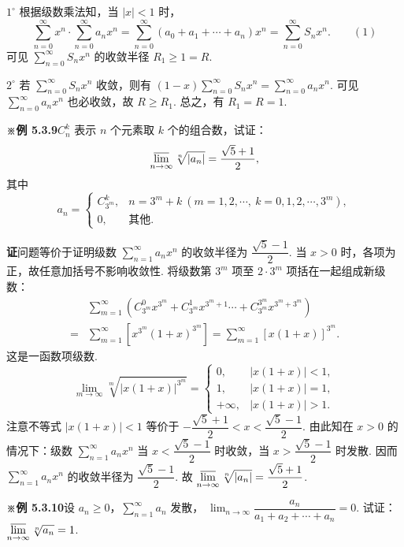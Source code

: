 \documentclass[UTF8,12pt,a4paper,fontset=fandol]{ctexart}
\begin{document}
$1^\circ$ 根据级数乘法知，当 $|x|<1$ 时，
\[
  \sum_{n=0}^{\infty}x^n\cdot\sum_{n=0}^{\infty}a_nx^n
  =\sum_{n=0}^{\infty}(a_0+a_1+\cdots+a_n)x^n
  =\sum_{n=0}^{\infty}S_nx^n.
\qquad(1)
\]
可见 $\displaystyle\sum_{n=0}^{\infty}S_nx^n$ 的收敛半径 $R_1\ge1=R$.

$2^\circ$ 若 $\displaystyle\sum_{n=0}^{\infty}S_nx^n$ 收敛，则有
$(1-x)\displaystyle\sum_{n=0}^{\infty}S_nx^n=\displaystyle\sum_{n=0}^{\infty}a_nx^n$. 可见
$\displaystyle\sum_{n=0}^{\infty}a_nx^n$ 也必收敛，故 $R\ge R_1$. 总之，有 $R_1=R=1$.

\noindent\textbf{※例 5.3.9}\quad $C_n^k$ 表示 $n$ 个元素取 $k$ 个的组合数，试证：
\[
  \varlimsup_{n\to\infty}\sqrt[n]{|a_n|}=\frac{\sqrt5+1}{2},
\]
其中
\[
  a_n=
  \begin{cases}
    C_{3^m}^{k},&n=3^m+k\ (m=1,2,\cdots,\ k=0,1,2,\cdots,3^m),\\
    0,&\text{其他}.
  \end{cases}
\]

\noindent\textbf{证}\quad 问题等价于证明级数
$\displaystyle\sum_{n=1}^{\infty}a_nx^n$ 的收敛半径为 $\dfrac{\sqrt5-1}{2}$. 当 $x>0$ 时，各项为正，故任意加括号不影响收敛性.
将级数第 $3^m$ 项至 $2\cdot3^m$ 项括在一起组成新级数：
\[
\begin{aligned}
&\sum_{m=1}^{\infty}\left(C_{3^m}^0x^{3^m}+C_{3^m}^1x^{3^m+1}
\cdots+C_{3^m}^{3^m}x^{3^m+3^m}\right)\\
={}&\sum_{m=1}^{\infty}\left[x^{3^m}(1+x)^{3^m}\right]
=\sum_{m=1}^{\infty}[x(1+x)]^{3^m}.
\end{aligned}
\]
这是一函数项级数.
\[
  \lim_{m\to\infty}\sqrt[m]{|x(1+x)|^{3^m}}=
  \begin{cases}
    0,&|x(1+x)|<1,\\
    1,&|x(1+x)|=1,\\
    +\infty,&|x(1+x)|>1.
  \end{cases}
\]
注意不等式 $|x(1+x)|<1$ 等价于
$-\dfrac{\sqrt5+1}{2}<x<\dfrac{\sqrt5-1}{2}$. 由此知在 $x>0$ 的情况下：级数
$\displaystyle\sum_{n=1}^{\infty}a_nx^n$ 当 $x<\dfrac{\sqrt5-1}{2}$ 时收敛，当
$x>\dfrac{\sqrt5-1}{2}$ 时发散. 因而 $\displaystyle\sum_{n=1}^{\infty}a_nx^n$ 的收敛半径为
$\dfrac{\sqrt5-1}{2}$. 故
$\displaystyle\varlimsup_{n\to\infty}\sqrt[n]{|a_n|}=\dfrac{\sqrt5+1}{2}$.

\noindent\textbf{※例 5.3.10}\quad 设 $a_n\ge0$，$\displaystyle\sum_{n=1}^{\infty}a_n$ 发散，
$\displaystyle\lim_{n\to\infty}\dfrac{a_n}{a_1+a_2+\cdots+a_n}=0$. 试证：
$\displaystyle\varlimsup_{n\to\infty}\sqrt[n]{a_n}=1$.
\end{document}
